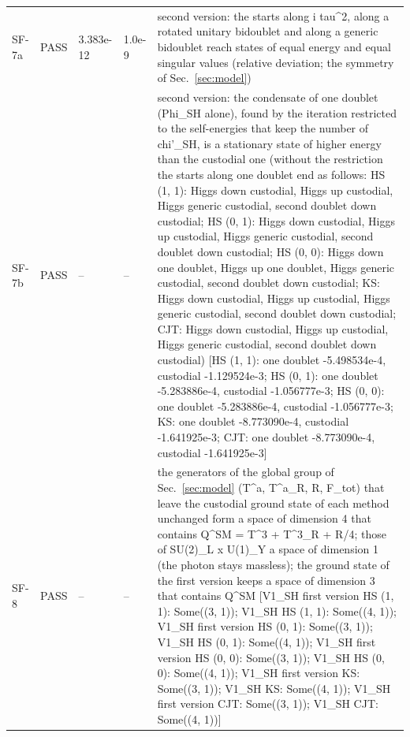 \documentclass[aps,prd,onecolumn,superscriptaddress,nofootinbib,floatfix,longbibliography]{revtex4-2}
\begin{document}
\begin{longtable}{p{}p{}p{}p{}p{}}
SF-7a & PASS & 3.383e-12 & 1.0e-9 & second version: the starts along i tau\textasciicircum{}2, along a rotated unitary bidoublet and along a generic bidoublet reach states of equal energy and equal singular values (relative deviation; the symmetry of Sec.~\ref{sec:model}) \\
SF-7b & PASS & -- & -- & second version: the condensate of one doublet (Phi\_SH alone), found by the iteration restricted to the self-energies that keep the number of chi'\_SH, is a stationary state of higher energy than the custodial one (without the restriction the starts along one doublet end as follows: HS (1, 1): Higgs down custodial, Higgs up custodial, Higgs generic custodial, second doublet down custodial; HS (0, 1): Higgs down custodial, Higgs up custodial, Higgs generic custodial, second doublet down custodial; HS (0, 0): Higgs down one doublet, Higgs up one doublet, Higgs generic custodial, second doublet down custodial; KS: Higgs down custodial, Higgs up custodial, Higgs generic custodial, second doublet down custodial; CJT: Higgs down custodial, Higgs up custodial, Higgs generic custodial, second doublet down custodial) [HS (1, 1): one doublet -5.498534e-4, custodial -1.129524e-3; HS (0, 1): one doublet -5.283886e-4, custodial -1.056777e-3; HS (0, 0): one doublet -5.283886e-4, custodial -1.056777e-3; KS: one doublet -8.773090e-4, custodial -1.641925e-3; CJT: one doublet -8.773090e-4, custodial -1.641925e-3] \\
SF-8 & PASS & -- & -- & the generators of the global group of Sec.~\ref{sec:model} (T\textasciicircum{}a, T\textasciicircum{}a\_R, R, F\_tot) that leave the custodial ground state of each method unchanged form a space of dimension 4 that contains Q\textasciicircum{}SM = T\textasciicircum{}3 + T\textasciicircum{}3\_R + R/4; those of SU(2)\_L x U(1)\_Y a space of dimension 1 (the photon stays massless); the ground state of the first version keeps a space of dimension 3 that contains Q\textasciicircum{}SM [V1\_SH first version HS (1, 1): Some((3, 1)); V1\_SH HS (1, 1): Some((4, 1)); V1\_SH first version HS (0, 1): Some((3, 1)); V1\_SH HS (0, 1): Some((4, 1)); V1\_SH first version HS (0, 0): Some((3, 1)); V1\_SH HS (0, 0): Some((4, 1)); V1\_SH first version KS: Some((3, 1)); V1\_SH KS: Some((4, 1)); V1\_SH first version CJT: Some((3, 1)); V1\_SH CJT: Some((4, 1))] \\

\end{longtable}
\end{document}
